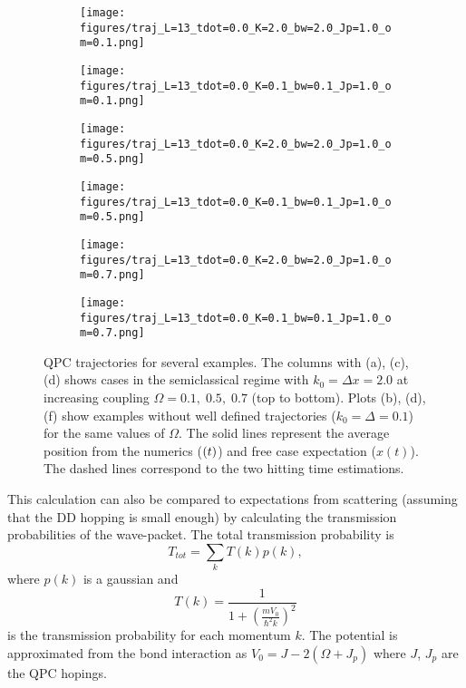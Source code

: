 \documentclass{article}
\begin{document}
\begin{figure*}[htb]
    \centering %
 \begin{subfigure}{0.4\textwidth}\hfill
 \caption{}
  \texttt{[image: figures/traj\_L=13\_tdot=0.0\_K=2.0\_bw=2.0\_Jp=1.0\_om=0.1.png]}
\end{subfigure} %
\begin{subfigure}{0.4\textwidth}\hfill
  \caption{}
  \texttt{[image: figures/traj\_L=13\_tdot=0.0\_K=0.1\_bw=0.1\_Jp=1.0\_om=0.1.png]}
\end{subfigure}%

\centering %
 \begin{subfigure}{0.4\textwidth}\hfill
   \caption{}
  \texttt{[image: figures/traj\_L=13\_tdot=0.0\_K=2.0\_bw=2.0\_Jp=1.0\_om=0.5.png]}
\end{subfigure} %
\begin{subfigure}{0.4\textwidth}\hfill
  \caption{}
  \texttt{[image: figures/traj\_L=13\_tdot=0.0\_K=0.1\_bw=0.1\_Jp=1.0\_om=0.5.png]}
\end{subfigure}%

\centering %
 \begin{subfigure}{0.4\textwidth}\hfill
   \caption{}
  \texttt{[image: figures/traj\_L=13\_tdot=0.0\_K=2.0\_bw=2.0\_Jp=1.0\_om=0.7.png]}
\end{subfigure} %
\begin{subfigure}{0.4\textwidth}\hfill
  \caption{}
  \texttt{[image: figures/traj\_L=13\_tdot=0.0\_K=0.1\_bw=0.1\_Jp=1.0\_om=0.7.png]}
\end{subfigure}%
\caption{QPC trajectories for several examples. The columns with (a), (c), (d) shows cases in the semiclassical regime with $k_0 = \Delta x = 2.0$ at increasing coupling $\Omega = 0.1, \; 0.5, \; 0.7$ (top to bottom). Plots (b), (d), (f) show examples without well defined trajectories ($k_0 = \Delta  = 0.1$) for the same values of $\Omega$. The solid lines represent the average position from the numerics ($\title{x}(t)$) and free case expectation ($x(t)$). The dashed lines correspond to the two hitting time estimations.}\label{fig:trajectories}
\end{figure*}

This calculation can also be compared to expectations from scattering (assuming that the DD hopping is small enough) by calculating the transmission probabilities of the wave-packet. The total transmission probability is
\begin{equation}
    T_{tot} = \sum_k T(k) p(k),
\end{equation}
where $p(k)$ is a gaussian and 
\begin{equation}
    T(k) = \frac{1}{1+\left(\frac{m V_0}{\hbar^2 k}\right)^2}
\end{equation}
is the transmission probability for each momentum $k$. The potential is approximated from the bond interaction as $V_0 = J-2(\Omega + J_p)$ where $J$, $J_p$ are the QPC hopings. 
\end{document}
